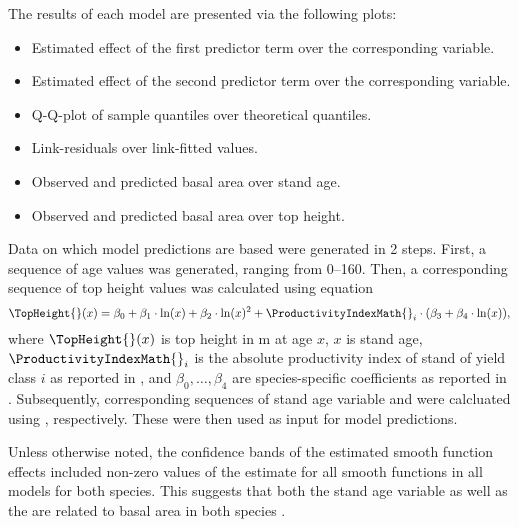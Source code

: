 The results of each model are presented via the following plots:
\begin{itemize}
\item Estimated effect of the first predictor term over the corresponding variable.
\item Estimated effect of the second predictor term over the corresponding variable.
\item Q-Q-plot of sample quantiles over theoretical quantiles.
\item Link-residuals over link-fitted values. 
\item Observed and predicted basal area over stand age.
\item Observed and predicted basal area over top height.
\end{itemize}

Data on which model predictions are based were generated in 2 steps. First, a sequence of age values was generated, ranging from \SIrange{0}{160}{\year}.  Then, a corresponding sequence of top height values was calculated using equation
\begin{equation}
  \label{eq:NagelFunctionSolvedForTopHeight}
  \TopHeight{}(x) = \beta_0 + \beta_1 \cdot \ln(x) + \beta_2 \cdot \ln(x)^2 + \ProductivityIndexMath{}_i \cdot (\beta_3 + \beta_4 \cdot \ln(x)),
\end{equation}
where \(\TopHeight{}(x)\) is top height in \si{\meter} at age \(x\), \(x\) is stand age, \(\ProductivityIndexMath{}_i\) is the absolute productivity index of stand of yield class \(i\) as reported in , and \(\beta_0, \ldots, \beta_4\) are species-specific coefficients as reported in  \parencite{Nagel1999}.  Subsequently, corresponding sequences of stand age variable and \ProductivityIndexVariableText{} were calcluated using , respectively.  These were then used as input for model predictions.

Unless otherwise noted, the confidence bands of the estimated smooth function effects included non-zero values of the estimate for all smooth functions in all models for both species.  This suggests that both the stand age variable as well as the \ProductivityIndexVariableText{} are related to basal area in both species \parencite{Wood2001}.

